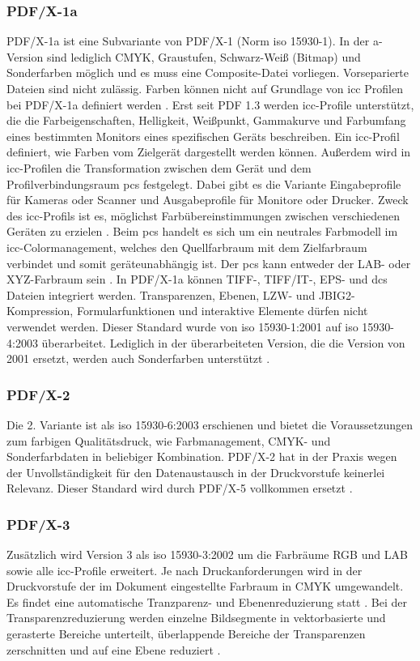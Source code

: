\subsubsection{PDF/X-1a}
PDF/X-1a ist eine Subvariante von PDF/X-1 (Norm \gls{iso} 15930-1). In der a-Version sind lediglich CMYK, Graustufen, Schwarz-Weiß (Bitmap) und Sonderfarben möglich und es muss eine Composite-Datei vorliegen. Vorseparierte Dateien sind nicht zulässig. Farben können nicht auf Grundlage von \gls{icc} Profilen bei PDF/X-1a definiert werden \cite{adobe-pdf-x, schneeberger}. Erst seit PDF 1.3 werden \gls{icc}-Profile unterstützt, die die Farbeigenschaften, Helligkeit, Weißpunkt, Gammakurve und Farbumfang eines bestimmten Monitors eines spezifischen Geräts beschreiben. Ein \gls{icc}-Profil definiert, wie Farben vom Zielgerät dargestellt werden können. Außerdem wird in \gls{icc}-Profilen die Transformation zwischen dem Gerät und dem Profilverbindungsraum \gls{pcs} festgelegt. Dabei gibt es die Variante Eingabeprofile für Kameras oder Scanner und Ausgabeprofile für Monitore oder Drucker. Zweck des \gls{icc}-Profils ist es, möglichst Farbübereinstimmungen zwischen verschiedenen Geräten zu erzielen \cite{benq}. Beim \gls{pcs} handelt es sich um ein neutrales Farbmodell im \gls{icc}-Colormanagement, welches den Quellfarbraum mit dem Zielfarbraum verbindet und somit geräteunabhängig ist. Der \gls{pcs} kann entweder der LAB- oder XYZ-Farbraum sein \cite{prepress}. In PDF/X-1a können  TIFF-, TIFF/IT-, EPS- und \gls{dcs} Dateien integriert werden. Transparenzen, Ebenen, LZW- und JBIG2-Kompression, Formularfunktionen und interaktive Elemente dürfen nicht verwendet werden. Dieser Standard wurde von \gls{iso} 15930-1:2001 auf \gls{iso} 15930-4:2003 überarbeitet. Lediglich in der überarbeiteten Version, die die Version von 2001 ersetzt, werden auch Sonderfarben unterstützt \cite{proj-consult, schneeberger}. 

\subsubsection{PDF/X-2}
Die 2. Variante ist als \gls{iso} 15930-6:2003 erschienen und bietet die Voraussetzungen zum farbigen Qualitätsdruck, wie Farbmanagement, CMYK- und Sonderfarbdaten in beliebiger Kombination. PDF/X-2 hat in der Praxis wegen der Unvollständigkeit für den Datenaustausch in der Druckvorstufe keinerlei Relevanz. Dieser Standard wird durch PDF/X-5 vollkommen ersetzt \cite{proj-consult, schneeberger}. 

\subsubsection{PDF/X-3}
Zusätzlich wird Version 3 als \gls{iso} 15930-3:2002 \cite{proj-consult} um die Farbräume RGB und LAB sowie alle \gls{icc}-Profile erweitert. Je nach Druckanforderungen wird in der Druckvorstufe der im Dokument eingestellte Farbraum in CMYK umgewandelt. Es findet eine automatische Tranzparenz- und Ebenenreduzierung statt \cite{adobe-pdf-x}. Bei der Transparenzreduzierung werden einzelne Bildsegmente in vektorbasierte und gerasterte Bereiche unterteilt, überlappende Bereiche der Transparenzen zerschnitten und auf eine Ebene reduziert \cite{adobe-transp, primus}.

